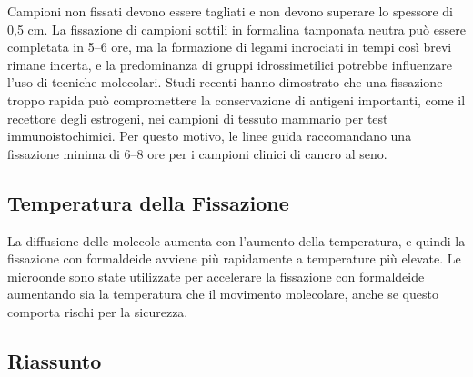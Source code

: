 Campioni non fissati devono essere tagliati e non devono superare lo spessore di 0,5 cm. La fissazione di campioni sottili in formalina tamponata neutra può essere completata in 5–6 ore, ma la formazione di legami incrociati in tempi così brevi rimane incerta, e la predominanza di gruppi idrossimetilici potrebbe influenzare l'uso di tecniche molecolari. Studi recenti hanno dimostrato che una fissazione troppo rapida può compromettere la conservazione di antigeni importanti, come il recettore degli estrogeni, nei campioni di tessuto mammario per test immunoistochimici. Per questo motivo, le linee guida raccomandano una fissazione minima di 6–8 ore per i campioni clinici di cancro al seno.

\subsection{Temperatura della Fissazione}
La diffusione delle molecole aumenta con l'aumento della temperatura, e quindi la fissazione con formaldeide avviene più rapidamente a temperature più elevate. Le microonde sono state utilizzate per accelerare la fissazione con formaldeide aumentando sia la temperatura che il movimento molecolare, anche se questo comporta rischi per la sicurezza.

\subsection {Riassunto} 

